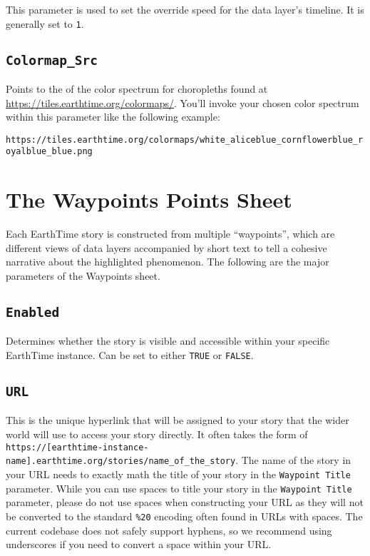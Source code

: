 \documentclass[
]{book}
\begin{document}
This parameter is used to set the override speed for the data layer's timeline. It is generally set to \texttt{1}.

\hypertarget{colormap_src}{%
\subsection*{\texorpdfstring{\texttt{Colormap\_Src}}{Colormap\_Src}}\label{colormap_src}}


Points to the of the color spectrum for choropleths found at \url{https://tiles.earthtime.org/colormaps/}. You'll invoke your chosen color spectrum within this parameter like the following example:

\texttt{https://tiles.earthtime.org/colormaps/white\_aliceblue\_cornflowerblue\_royalblue\_blue.png}

\hypertarget{the-waypoints-points-sheet}{%
\section{The Waypoints Points Sheet}\label{the-waypoints-points-sheet}}

Each EarthTime story is constructed from multiple ``waypoints'', which are different views of data layers accompanied by short text to tell a cohesive narrative about the highlighted phenomenon. The following are the major parameters of the Waypoints sheet.

\hypertarget{enabled-1}{%
\subsection*{\texorpdfstring{\texttt{Enabled}}{Enabled}}\label{enabled-1}}


Determines whether the story is visible and accessible within your specific EarthTime instance. Can be set to either \texttt{TRUE} or \texttt{FALSE}.

\hypertarget{url-1}{%
\subsection*{\texorpdfstring{\texttt{URL}}{URL}}\label{url-1}}


This is the unique hyperlink that will be assigned to your story that the wider world will use to access your story directly. It often takes the form of \texttt{https://{[}earthtime-instance-name{]}.earthtime.org/stories/name\_of\_the\_story}. The name of the story in your URL needs to exactly math the title of your story in the \texttt{Waypoint\ Title} parameter. While you can use spaces to title your story in the \texttt{Waypoint\ Title} parameter, please do not use spaces when constructing your URL as they will not be converted to the standard \texttt{\%20} encoding often found in URLs with spaces. The current codebase does not safely support hyphens, so we recommend using underscores if you need to convert a space within your URL.
\end{document}
